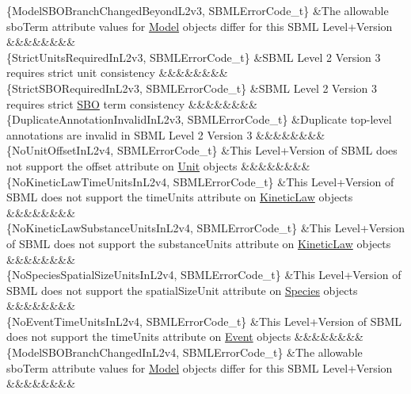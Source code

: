 \begin{DoxyParagraph}{}
\begin{longtabu}
\{Model\+S\+B\+O\+Branch\+Changed\+Beyond\+L2v3, S\+B\+M\+L\+Error\+Code\+\_\+t\} &The allowable \textquotesingle{}sbo\+Term\textquotesingle{} attribute values for \hyperlink{class_model}{Model} objects differ for this S\+B\+ML Level+\+Version &&&&&&&&\\
\{Strict\+Units\+Required\+In\+L2v3, S\+B\+M\+L\+Error\+Code\+\_\+t\} &S\+B\+ML Level 2 Version 3 requires strict unit consistency &&&&&&&&\\
\{Strict\+S\+B\+O\+Required\+In\+L2v3, S\+B\+M\+L\+Error\+Code\+\_\+t\} &S\+B\+ML Level 2 Version 3 requires strict \hyperlink{class_s_b_o}{S\+BO} term consistency &&&&&&&&\\
\{Duplicate\+Annotation\+Invalid\+In\+L2v3, S\+B\+M\+L\+Error\+Code\+\_\+t\} &Duplicate top-\/level annotations are invalid in S\+B\+ML Level 2 Version 3 &&&&&&&&\\
\{No\+Unit\+Offset\+In\+L2v4, S\+B\+M\+L\+Error\+Code\+\_\+t\} &This Level+\+Version of S\+B\+ML does not support the \textquotesingle{}offset\textquotesingle{} attribute on \hyperlink{class_unit}{Unit} objects &&&&&&&&\\
\{No\+Kinetic\+Law\+Time\+Units\+In\+L2v4, S\+B\+M\+L\+Error\+Code\+\_\+t\} &This Level+\+Version of S\+B\+ML does not support the \textquotesingle{}time\+Units\textquotesingle{} attribute on \hyperlink{class_kinetic_law}{Kinetic\+Law} objects &&&&&&&&\\
\{No\+Kinetic\+Law\+Substance\+Units\+In\+L2v4, S\+B\+M\+L\+Error\+Code\+\_\+t\} &This Level+\+Version of S\+B\+ML does not support the \textquotesingle{}substance\+Units\textquotesingle{} attribute on \hyperlink{class_kinetic_law}{Kinetic\+Law} objects &&&&&&&&\\
\{No\+Species\+Spatial\+Size\+Units\+In\+L2v4, S\+B\+M\+L\+Error\+Code\+\_\+t\} &This Level+\+Version of S\+B\+ML does not support the \textquotesingle{}spatial\+Size\+Unit\textquotesingle{} attribute on \hyperlink{class_species}{Species} objects &&&&&&&&\\
\{No\+Event\+Time\+Units\+In\+L2v4, S\+B\+M\+L\+Error\+Code\+\_\+t\} &This Level+\+Version of S\+B\+ML does not support the \textquotesingle{}time\+Units\textquotesingle{} attribute on \hyperlink{class_event}{Event} objects &&&&&&&&\\
\{Model\+S\+B\+O\+Branch\+Changed\+In\+L2v4, S\+B\+M\+L\+Error\+Code\+\_\+t\} &The allowable \textquotesingle{}sbo\+Term\textquotesingle{} attribute values for \hyperlink{class_model}{Model} objects differ for this S\+B\+ML Level+\+Version &&&&&&&&\\

\end{longtabu}
\end{DoxyParagraph}
